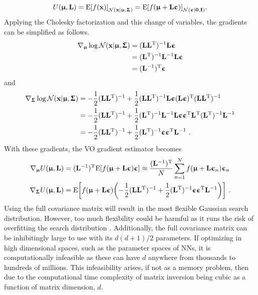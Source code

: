 \begin{equation}
    U({\boldsymbol{\upmu}},{\mathbf{L}}) = \text{E}{\left[f({\mathbf{x}})\right]}_{\mathcal{N}({\mathbf{x}}|{{\boldsymbol{\upmu}},{\boldsymbol{\Upsigma}}})}  = \text{E}{\left[f({\boldsymbol{\upmu}}+ {\mathbf{L}}{\boldsymbol{\upepsilon}})\right]}_{\mathcal{N}({\boldsymbol{\upepsilon}}|{{\mathbf{0}},{\mathbf{I}}})}.
\end{equation}
Applying the Cholesky factorization and this change of variables, the gradients can be simplified as follows.
\begin{align}
    \nabla_{\boldsymbol{\upmu}}\log\mathcal{N}({\mathbf{x}}|{\boldsymbol{\upmu}},{\boldsymbol{\Upsigma}})
    &= ({\mathbf{L}}{\mathbf{L}}{^\mathrm{T}})^{-1}{\mathbf{L}}{\boldsymbol{\upepsilon}}\nonumber\\
    &= ({\mathbf{L}}{^\mathrm{T}})^{-1}{\mathbf{L}}^{-1}{\mathbf{L}}{\boldsymbol{\upepsilon}}\nonumber\\
    &= ({\mathbf{L}}^{-1}){^\mathrm{T}}{\boldsymbol{\upepsilon}}
\end{align}
and
\begin{align}
    \nabla_{\boldsymbol{\Upsigma}}\log\mathcal{N}({\mathbf{x}}|{\boldsymbol{\upmu}},{\boldsymbol{\Upsigma}})
    &= -\frac{1}{2}({\mathbf{L}}{\mathbf{L}}{^\mathrm{T}})^{-1} + \frac{1}{2}({\mathbf{L}}{\mathbf{L}}{^\mathrm{T}})^{-1}{\mathbf{L}}{\boldsymbol{\upepsilon}}({\mathbf{L}}{\boldsymbol{\upepsilon}}){^\mathrm{T}}({\mathbf{L}}{\mathbf{L}}{^\mathrm{T}})^{-1}\nonumber\\
    &= -\frac{1}{2}({\mathbf{L}}{\mathbf{L}}{^\mathrm{T}})^{-1} + \frac{1}{2}({\mathbf{L}}{^\mathrm{T}})^{-1}{\mathbf{L}}^{-1}{\mathbf{L}}{\boldsymbol{\upepsilon}}{\boldsymbol{\upepsilon}}{^\mathrm{T}}{\mathbf{L}}{^\mathrm{T}}({\mathbf{L}}{^\mathrm{T}})^{-1}{\mathbf{L}}^{-1}\nonumber\\
    &= -\frac{1}{2}({\mathbf{L}}{\mathbf{L}}{^\mathrm{T}})^{-1} + \frac{1}{2}({\mathbf{L}}{^\mathrm{T}})^{-1}{\boldsymbol{\upepsilon}}{\boldsymbol{\upepsilon}}{^\mathrm{T}}{\mathbf{L}}^{-1} \ .
\end{align}
With these gradients, the \gls{VO} gradient estimator becomes
\begin{equation}\label{eq: Theory: Variational optimization multivariate gaussian gradient estimators}
    \begin{aligned}
        \nabla_{\boldsymbol{\upmu}} U({\boldsymbol{\upmu}},{\mathbf{L}}) &= ({\mathbf{L}}^{-1}){^\mathrm{T}}\text{E}{\left[f({\boldsymbol{\upmu}}+{\mathbf{L}}{\boldsymbol{\upepsilon}}){\boldsymbol{\upepsilon}}\right]} \approx \frac{({\mathbf{L}}^{-1}){^\mathrm{T}}}{N}\sum_{n=1}^N f({\boldsymbol{\upmu}}+{\mathbf{L}}{\boldsymbol{\upepsilon}}_n){\boldsymbol{\upepsilon}}_n\\
        \nabla_{\boldsymbol{\Upsigma}} U({\boldsymbol{\upmu}},{\mathbf{L}}) &= \text{E}{\left[f({\boldsymbol{\upmu}}+{\mathbf{L}}{\boldsymbol{\upepsilon}}){\left(-\frac{1}{2}({\mathbf{L}}{\mathbf{L}}{^\mathrm{T}})^{-1} + \frac{1}{2}({\mathbf{L}}{^\mathrm{T}})^{-1}{\boldsymbol{\upepsilon}}{\boldsymbol{\upepsilon}}{^\mathrm{T}}{\mathbf{L}}^{-1}\right)}\right]} \ .
    \end{aligned}
\end{equation}
Using the full covariance matrix will result in the most flexible Gaussian search distribution. However, too much flexibility could be harmful as it runs the risk of overfitting the search distribution \cite{Magdon-Ismail2010}. Additionally, the full covariance matrix can be inhibitingly large to use with its $d(d+1)/2$ parameters.  If optimizing in high dimensional spaces, such as the parameter spaces of \glspl{NN}, it is computationally infeasible as these can have $d$ anywhere from thousands to hundreds of millions. This infeasibility arises, if not as a memory problem, then due to the computational time complexity of matrix inversion being cubic as a function of matrix dimension, $d$.
